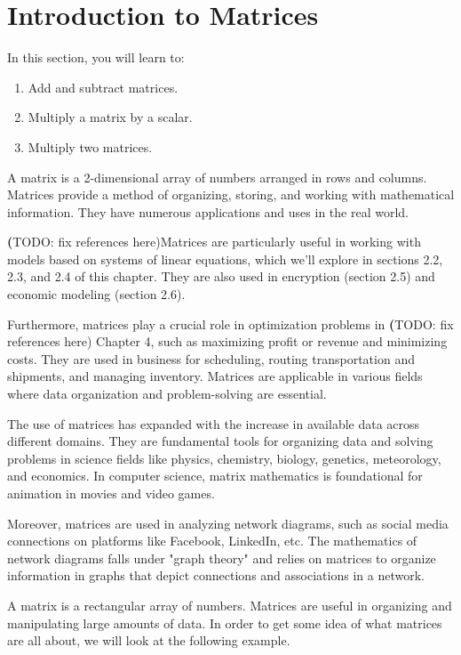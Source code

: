 \section{Introduction to Matrices}

In this section, you will learn to:
\begin{enumerate}
    \item Add and subtract matrices.
    \item Multiply a matrix by a scalar.
    \item Multiply two matrices.
\end{enumerate}

A matrix is a 2-dimensional array of numbers arranged in rows and columns. Matrices provide a method of organizing, storing, and working with mathematical information. They have numerous applications and uses in the real world.

\textbf(TODO: fix references here)Matrices are particularly useful in working with models based on systems of linear equations, which we'll explore in sections 2.2, 2.3, and 2.4 of this chapter. They are also used in encryption (section 2.5) and economic modeling (section 2.6).

Furthermore, matrices play a crucial role in optimization problems in \textbf(TODO: fix references here) Chapter 4, such as maximizing profit or revenue and minimizing costs. They are used in business for scheduling, routing transportation and shipments, and managing inventory. Matrices are applicable in various fields where data organization and problem-solving are essential.

The use of matrices has expanded with the increase in available data across different domains. They are fundamental tools for organizing data and solving problems in science fields like physics, chemistry, biology, genetics, meteorology, and economics. In computer science, matrix mathematics is foundational for animation in movies and video games.

Moreover, matrices are used in analyzing network diagrams, such as social media connections on platforms like Facebook, LinkedIn, etc. The mathematics of network diagrams falls under "graph theory" and relies on matrices to organize information in graphs that depict connections and associations in a network.

A matrix is a rectangular array of numbers. Matrices are useful in organizing and manipulating large amounts of data. In order to get some idea of what matrices are all about, we will look at the following example.

